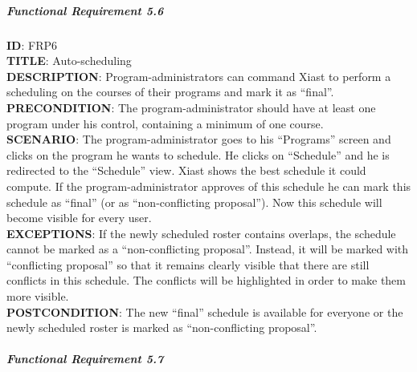 \documentclass[9pt]{article}
\begin{document}
\subparagraph{Functional Requirement
5.6}\label{functional-requirement-5.6}

\textbf{ID}: FRP6\\\textbf{TITLE}:
Auto-scheduling\\\textbf{DESCRIPTION}: Program-administrators can
command Xiast to perform a scheduling on the courses of their programs
and mark it as ``final''.\\\textbf{PRECONDITION}: The
program-administrator should have at least one program under his
control, containing a minimum of one course.\\\textbf{SCENARIO}: The
program-administrator goes to his ``Programs'' screen and clicks on the
program he wants to schedule. He clicks on ``Schedule'' and he is
redirected to the ``Schedule'' view. Xiast shows the best schedule it
could compute. If the program-administrator approves of this schedule he
can mark this schedule as ``final'' (or as ``non-conflicting
proposal''). Now this schedule will become visible for every
user.\\\textbf{EXCEPTIONS}: If the newly scheduled roster contains
overlaps, the schedule cannot be marked as a ``non-conflicting
proposal''. Instead, it will be marked with ``conflicting proposal'' so
that it remains clearly visible that there are still conflicts in this
schedule. The conflicts will be highlighted in order to make them more
visible.\\\textbf{POSTCONDITION}: The new ``final'' schedule is
available for everyone or the newly scheduled roster is marked as
``non-conflicting proposal''.

\subparagraph{Functional Requirement
5.7}\label{functional-requirement-5.7}
\end{document}
